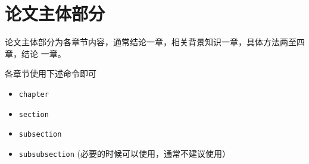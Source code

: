 
\chapter{论文主体部分}
\label{cha:mainmatter}

论文主体部分为各章节内容，通常结论一章，相关背景知识一章，具体方法两至四章，结论
一章。

各章节使用下述命令即可
\begin{itemize}
\item \texttt{chapter}
\item \texttt{section}
\item \texttt{subsection}
\item \texttt{subsubsection} (必要的时候可以使用，通常不建议使用）
\end{itemize}


